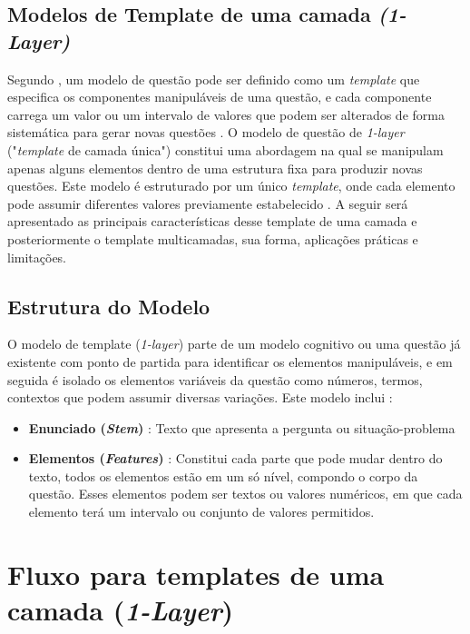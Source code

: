 \subsection{Modelos de Template de uma camada \textit{(1-Layer)}}

Segundo \parencite{gierl2021}, um modelo de questão pode ser definido como um \textit{template} que especifica os componentes manipuláveis de uma questão, e cada componente carrega um valor ou um intervalo de valores que podem ser alterados de forma sistemática para gerar novas questões . O modelo de questão de \textit{1-layer} ("\textit{template} de camada única") constitui uma abordagem na qual se manipulam apenas alguns elementos dentro de uma estrutura fixa para produzir novas questões. Este modelo é estruturado por um único \textit{template}, onde cada elemento pode assumir diferentes valores previamente estabelecido \parencite{lai2013}. A seguir será apresentado as principais características desse template de uma camada e posteriormente o template multicamadas, sua forma, aplicações práticas e limitações.

\subsection{Estrutura do Modelo}

O modelo de template (\textit{1-layer}) parte de um modelo cognitivo ou uma questão já existente com ponto de partida para identificar os elementos manipuláveis, e em seguida é isolado os elementos variáveis da questão como números, termos, contextos que podem assumir diversas variações. Este modelo inclui : 

\begin{itemize}
    \item \textbf{Enunciado (\textit{Stem})} : Texto que apresenta a pergunta ou situação-problema
    \item \textbf{Elementos (\textit{Features})} : Constitui cada parte que pode mudar dentro do texto, todos os elementos estão em um só nível, compondo o corpo da questão. Esses elementos podem ser textos ou valores numéricos, em que cada elemento terá um intervalo ou conjunto de valores permitidos.
\end{itemize}

\section{Fluxo para templates de uma camada (\textit{1-Layer})}

